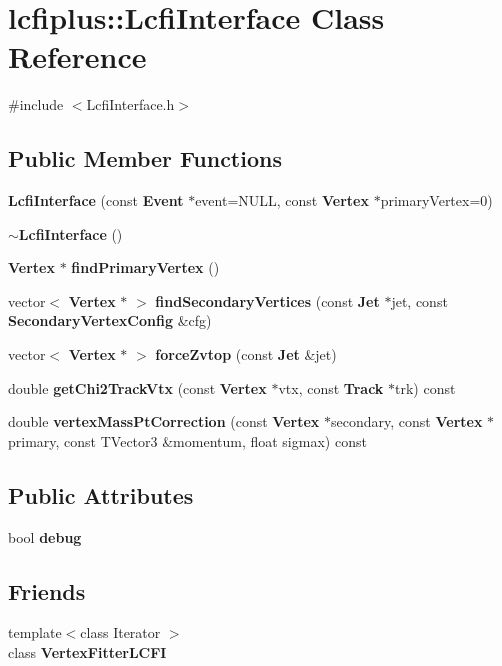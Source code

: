 \section{lcfiplus\+:\+:Lcfi\+Interface Class Reference}
\label{classlcfiplus_1_1LcfiInterface}


{\ttfamily \#include $<$Lcfi\+Interface.\+h$>$}

\subsection*{Public Member Functions}
\begin{DoxyCompactItemize}
\item 
\textbf{ Lcfi\+Interface} (const \textbf{ Event} $\ast$event=N\+U\+LL, const \textbf{ Vertex} $\ast$primary\+Vertex=0)
\item 
\textbf{ $\sim$\+Lcfi\+Interface} ()
\item 
\textbf{ Vertex} $\ast$ \textbf{ find\+Primary\+Vertex} ()
\item 
vector$<$ \textbf{ Vertex} $\ast$ $>$ \textbf{ find\+Secondary\+Vertices} (const \textbf{ Jet} $\ast$jet, const \textbf{ Secondary\+Vertex\+Config} \&cfg)
\item 
vector$<$ \textbf{ Vertex} $\ast$ $>$ \textbf{ force\+Zvtop} (const \textbf{ Jet} \&jet)
\item 
double \textbf{ get\+Chi2\+Track\+Vtx} (const \textbf{ Vertex} $\ast$vtx, const \textbf{ Track} $\ast$trk) const
\item 
double \textbf{ vertex\+Mass\+Pt\+Correction} (const \textbf{ Vertex} $\ast$secondary, const \textbf{ Vertex} $\ast$primary, const T\+Vector3 \&momentum, float sigmax) const
\end{DoxyCompactItemize}
\subsection*{Public Attributes}
\begin{DoxyCompactItemize}
\item 
bool \textbf{ debug}
\end{DoxyCompactItemize}
\subsection*{Friends}
\begin{DoxyCompactItemize}
\item 
{\footnotesize template$<$class Iterator $>$ }\\class \textbf{ Vertex\+Fitter\+L\+C\+FI}
\end{DoxyCompactItemize}


